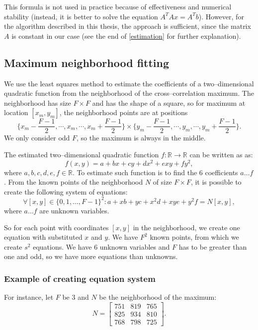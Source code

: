 This formula is not used in practice because of effectiveness and numerical stability (instead, it is better to solve the equation $A^TAx = A^Tb$). However, for the algorithm described in this thesis, the approach is sufficient, since the matrix $A$ is constant in our case (see the end of \cref{estimation} for further explanation).

\subsection{Maximum neighborhood fitting}

We use the least squares method to estimate the coefficients of a two--dimensional quadratic function from the neighborhood of the cross--cor\-re\-la\-tion maximum. The neighborhood has size $F \times F$ and has the shape of a square, so for maximum at location $[x_m, y_m]$, the neighborhood points are at positions 
\[
\{x_m - \frac{F-1}{2}, \cdots, x_m, \cdots, x_m + \frac{F-1}{2}\} \times \{y_m - \frac{F-1}{2}, \cdots, y_m, \cdots, y_m + \frac{F-1}{2}\}.
\]
We only consider odd $F$, so the maximum is always in the middle.

The estimated two--dimensional quadratic function $f:\mathbb{R} \rightarrow \mathbb{R}$ can be written as as:
\[
f(x,y) = a + bx + cy + dx^2 + exy + fy^2,
\]
where $a, b, c, d, e, f \in \mathbb{R}$. To estimate such function is to find the 6 coefficients $a \dots f$. From the known points of the neighborhood $N$ of size $F \times F$, it is possible to create the following system of equations:
\[
\forall [x,y] \in \{0,1,\dots , F-1\}^2 : a + xb + yc + x^2d + xye + y^2f = N[x,y],
\]
where $a \dots f$ are unknown variables.

So for each point with coordinates $[x,y]$ in the neighborhood, we create one equation with substituted $x$ and $y$. We have $F^2$ known points, from which we create $s^2$ equations. We have 6 unknown variables and $F$ has to be greater than one and odd, so we have more equations than unknowns. 

\subsubsection{Example of creating equation system}

For instance, let $F$ be 3 and $N$ be the neighborhood of the maximum:
\[
N =
\begin{bmatrix}
751 & 819 & 765 \\
825 & 934 & 810 \\
768 & 798 & 725
\end{bmatrix}.
\]


